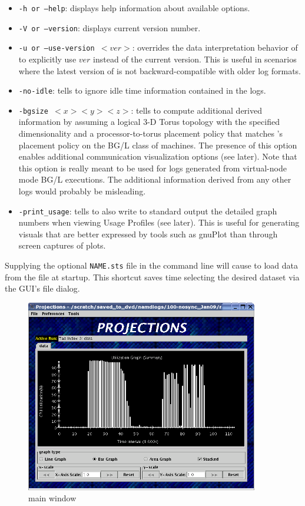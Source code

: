 \documentclass[10pt]{report}
\begin{document}
\begin{itemize}
\item
{\tt -h or --help}: displays help information about available options.
\item
{\tt -V or --version}: displays current \projections{} version number.
\item
{\tt -u or --use-version $<ver>$}: overrides the data interpretation
behavior of \projections{} to explicitly use $ver$ instead of the
current version. This is useful in scenarios where the latest version
of \projections{} is not backward-compatible with older log formats.
\item
{\tt -no-idle}: tells \projections{} to ignore idle time information
contained in the logs.
\item
{\tt -bgsize $<x> <y> <z>$}: tells \projections{} to compute
additional derived information by assuming a logical 3-D Torus
topology with the specified dimensionality and a processor-to-torus
placement policy that matches \charmpp's placement policy on the BG/L
class of machines. The presence of this option enables additional
communication visualization options (see later). Note that this option
is really meant to be used for logs generated from virtual-node mode
BG/L executions. The additional information derived from any other
logs would probably be misleading.
\item
{\tt -print\_usage}: tells \projections{} to also write to standard
output the detailed graph numbers when viewing Usage Profiles (see
later). This is useful for generating visuals that are better
expressed by tools such as gnuPlot than through screen captures of
\projections{} plots.
\end{itemize}

Supplying the optional {\tt NAME.sts} file in the command line will
cause \projections{} to load data from the file at startup. This shortcut
saves time selecting the desired dataset via the GUI's file dialog.

\begin{figure}[hbt]
\center
\includegraphics[width=4.0in]{fig/front-with-summary}
\caption{\projections{} main window}
\label{mainwindow}
\end{figure}
\end{document}
